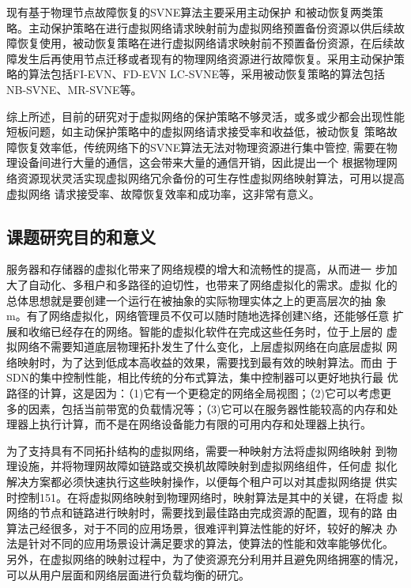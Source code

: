 现有基于物理节点故障恢复的SVNE算法主要采用主动保护\cite{yu2011cost,wang2014survivable,sun2010efficient,hu2012location} 和被动恢复\cite{rahman2010survivable,qiang2014heuristic,bo2014dynamic}两类策略。主动保护策略在进行虚拟网络请求映射前为虚拟网络预置备份资源以供后续故障恢复使用，被动恢复策略在进行虚拟网络请求映射前不预置备份资源，在后续故障发生后再使用节点迁移或者现有的物理网络资源进行故障恢复。采用主动保护策略的算法包括FI-EVN\cite{yu2011cost}、FD-EVN\cite{wang2014survivable} LC-SVNE\cite{hu2012location}等，采用被动恢复策略的算法包括NB-SVNE\cite{bo2p014dynamic}、MR-SVNE\cite{qiang2014heuristic}等。



综上所述，目前的研究对于虚拟网络的保护策略不够灵活，或多或少都会出现性能短板问题，如主动保护策略中的虚拟网络请求接受率和收益低，被动恢复 策略故障恢复效率低，传统网络下的SVNE算法无法对物理资源进行集中管控, 需要在物理设备间进行大量的通信，这会带来大量的通信开销，因此提出一个 根据物理网络资源现状灵活实现虚拟网络冗佘备份的可生存性虚拟网络映射算法，可用以提高虚拟网络 请求接受率、故障恢复效率和成功率，这非常有意义。







\subsection{课题研究目的和意义}
服务器和存储器的虚拟化带来了网络规模的增大和流畅性的提高，从而进一 步加大了自动化、多租户和多路径的迫切性，也带来了网络虚拟化的需求。虚拟 化的总体思想就是要创建一个运行在被抽象的实际物理实体之上的更高层次的抽 象m。有了网络虚拟化，网络管理员不仅可以随时随地选择创建N络，还能够任意 扩展和收缩已经存在的网络。智能的虚拟化软件在完成这些任务时，位于上层的 虚拟网络不需要知道底层物理拓扑发生了什么变化，上层虚拟网络在向底层虚拟 网络映射时，为了达到低成本高收益的效果，需要找到最有效的映射算法。而由 于SDN的集中控制性能，相比传统的分布式算法，集中控制器可以更好地执行最 优路径的计算，这是因为：（1)它有一个更稳定的网络全局视图；（2)它可以考虑更 多的因素，包括当前带宽的负载情况等；（3)它可以在服务器性能较高的内存和处 理器上执行计算，而不是在网络设备能力有限的可用内存和处理器上执行。

为了支持具有不同拓扑结构的虚拟网络，需要一种映射方法将虚拟网络映射 到物理设施，并将物理网故障如链路或交换机故障映射到虚拟网络组件，任何虚 拟化解决方案都必须快速执行这些映射操作，以便每个租户可以对其虚拟网络提 供实时控制151。在将虚拟网络映射到物理网络时，映射算法是其中的关键，在将虚 拟网络的节点和链路进行映射时，需要找到最佳路由完成资源的配置，现有的路 由算法己经很多，对于不同的应用场景，很难评判算法性能的好坏，较好的解决 办法是针对不同的应用场景设计满足要求的算法，使算法的性能和效率能够优化。 另外，在虚拟网络的映射过程中，为了使资源充分利用并且避免网络拥塞的情况， 可以从用户层面和网络层面进行负载均衡的研宂。


